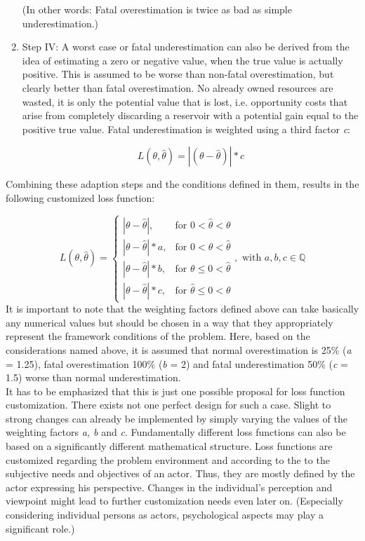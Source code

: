 \begin{enumerate}
			(In other words: Fatal overestimation is twice as bad as simple underestimation.)
			
			\item Step IV: A worst case or fatal underestimation can also be derived from the idea of estimating a zero or negative value, when the true value is actually positive. This is assumed to be worse than non-fatal overestimation, but clearly better than fatal overestimation. No already owned resources are wasted, it is only the potential value that is lost, i.e. opportunity costs that arise from completely discarding a reservoir with a potential gain equal to the positive true value. Fatal underestimation is weighted using a third factor \textit{c}:
					
			\begin{equation}\label{eq:LF_IV}
			L(\theta,\hat{\theta}) = |(\theta-\hat{\theta})|*c
			\end{equation}
			
		\end{enumerate}
		
		Combining these adaption steps and the conditions defined in them, results in the following customized loss function:
		
		\begin{equation}\label{eq:LF_final}
		L(\theta,\hat{\theta}) =
		\begin{cases}
		|\theta - \hat{\theta}|, & \text{for } 0<\hat{\theta}<\theta  \\
		|\theta-\hat{\theta}|*a, & \text{for } 0<\theta<\hat{\theta} \\
		|\theta-\hat{\theta}|*b, & \text{for } \theta\leq0<\hat{\theta} \\
		|\theta-\hat{\theta}|*c, & \text{for } \hat{\theta}\leq0<\theta 
		\end{cases},
		\text{ with } a,b,c \in \mathbb{Q}
		\end{equation}  
		It is important to note that the weighting factors defined above can take basically any numerical values but should be chosen in a way that they appropriately represent the framework conditions of the problem. Here, based on the considerations named above, it is assumed that normal overestimation is 25\% (\textit{a} = 1.25), fatal overestimation 100\% (\textit{b} = 2) and fatal underestimation 50\% (\textit{c} = 1.5) worse than normal underestimation. \\		
		It has to be emphasized that this is just one possible proposal for loss function customization. There exists not one perfect design for such a case. Slight to strong changes can already be implemented by simply varying the values of the weighting factors \textit{a, b} and \textit{c}. Fundamentally different loss functions can also be based on a significantly different mathematical structure. Loss functions are customized regarding the problem environment and according to the to the subjective needs and objectives of an actor. Thus, they are mostly defined by the actor expressing his perspective. Changes in the individual's perception and viewpoint might lead to further customization needs even later on. (Especially considering individual persons as actors, psychological aspects may play a significant role.)
		
